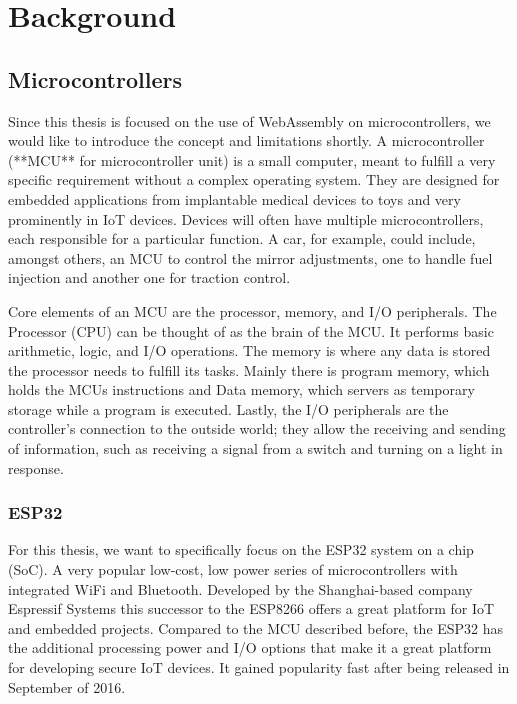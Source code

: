 
\chapter{Background}\label{chapter:background}

\section{Microcontrollers}
Since this thesis is focused on the use of WebAssembly on microcontrollers, we would like to introduce the concept and limitations shortly. A microcontroller (**MCU** for microcontroller unit) is a small computer, meant to fulfill a very specific requirement without a complex operating system. They are designed for embedded applications from implantable medical devices to toys and very prominently in IoT devices. Devices will often have multiple microcontrollers, each responsible for a particular function. A car, for example, could include, amongst others, an MCU to control the mirror adjustments, one to handle fuel injection and another one for traction control.

Core elements of an MCU are the processor, memory, and I/O peripherals. The Processor (CPU) can be thought of as the brain of the MCU. It performs basic arithmetic, logic, and I/O operations. The memory is where any data is stored the processor needs to fulfill its tasks. Mainly there is program memory, which holds the MCUs instructions and Data memory, which servers as temporary storage while a program is executed. Lastly, the I/O peripherals are the controller's connection to the outside world; they allow the receiving and sending of information, such as receiving a signal from a switch and turning on a light in response.
\subsection{ESP32}
For this thesis, we want to specifically focus on the ESP32 system on a chip (SoC). A very popular low-cost, low power series of microcontrollers with integrated WiFi and Bluetooth. Developed by the Shanghai-based company Espressif Systems this successor to the ESP8266 offers a great platform for IoT and embedded projects\autocite{noauthor_esp32_nodate}. Compared to the MCU described before, the ESP32 has the additional processing power and I/O options that make it a great platform for developing secure IoT devices. It gained popularity fast after being released in September of 2016.

